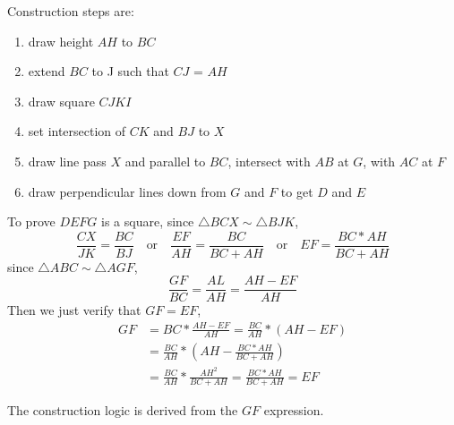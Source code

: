 \documentclass[10pt]{article}
\begin{document}
	\noindent
	Construction steps are:
	\begin{enumerate}
		\item draw height $AH$ to $BC$
		\item extend $BC$ to J such that $CJ$ = $AH$
		\item draw square $CJKI$
		\item set intersection of $CK$ and $BJ$ to $X$
		\item draw line pass $X$ and parallel to $BC$, intersect with $AB$ at $G$, with $AC$ at $F$
		\item draw perpendicular lines down from $G$ and $F$ to get $D$ and $E$		
	\end{enumerate}

	\noindent
	To prove $DEFG$ is a square, since $\triangle BCX \sim \triangle BJK$,
	\begin{equation}
		\frac{CX}{JK} = \frac{BC}{BJ} 
		\quad \textrm{or} \quad \frac{EF}{AH} = \frac{BC}{BC + AH}
		\quad \textrm{or} \quad EF = \frac{BC * AH}{BC + AH}
	\end{equation}
	since $\triangle ABC \sim \triangle AGF$,
	\begin{equation}
		\frac{GF}{BC} = \frac{AL}{AH} = \frac{AH - EF}{AH}		
	\end{equation}
	Then we just verify that $GF = EF$,
	\begin{equation}
		\begin{aligned}
		GF &= BC * \frac{AH - EF}{AH} = \frac{BC}{AH} *(AH - EF)\\ 
		   &= \frac{BC}{AH} * (AH - \frac{BC * AH}{BC + AH})\\
		   &= \frac{BC}{AH} * \frac{AH^2}{BC + AH} = \frac{BC * AH}{BC + AH} = EF
		\end{aligned}
	\end{equation}

	\noindent
	The construction logic is derived from the $GF$ expression.
\end{document}
